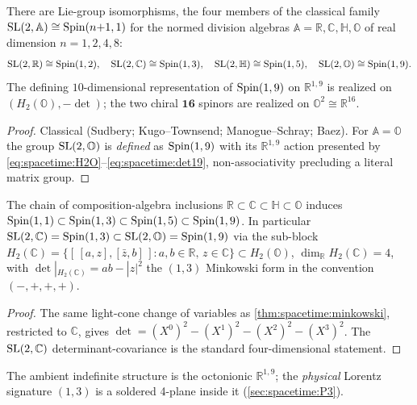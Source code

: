 \begin{theorem}
\label{thm:spacetime:exc}
There are Lie-group isomorphisms, the four members of the classical family
$\mathrm{SL}(2,\mathbb A)\cong\operatorname{Spin}(n{+}1,1)$ for the normed division algebras
$\mathbb A=\mathbb R,\mathbb C,\mathbb H,\mathbb O$ of real dimension $n=1,2,4,8$:
\begin{equation}\label{eq:spacetime:sl2}
  \mathrm{SL}(2,\mathbb R)\cong\operatorname{Spin}(1,2),\quad
  \mathrm{SL}(2,\mathbb C)\cong\operatorname{Spin}(1,3),\quad
  \mathrm{SL}(2,\mathbb H)\cong\operatorname{Spin}(1,5),\quad
  \mathrm{SL}(2,\mathbb O)\cong\operatorname{Spin}(1,9).
\end{equation}
The defining $10$-dimensional representation of $\operatorname{Spin}(1,9)$ on $\mathbb R^{1,9}$ is
realized on $(H_2(\mathbb O),-\det)$; the two chiral $\mathbf{16}$ spinors are
realized on $\mathbb O^2\cong\mathbb R^{16}$.
\end{theorem}
\begin{proof}
Classical (Sudbery; Kugo--Townsend; Manogue--Schray; Baez). For $\mathbb A=\mathbb O$
the group $\mathrm{SL}(2,\mathbb O)$ is \emph{defined} as $\operatorname{Spin}(1,9)$ with its
$\mathbb R^{1,9}$ action presented by \eqref{eq:spacetime:H2O}--\eqref{eq:spacetime:det19},
non-associativity precluding a literal matrix group.
\end{proof}

\begin{theorem}
\label{thm:spacetime:lorentz4}
\label{thm:Lorentz}
The chain of composition-algebra inclusions $\mathbb R\subset\mathbb C\subset\mathbb H\subset\mathbb O$
induces $\operatorname{Spin}(1,1)\subset\operatorname{Spin}(1,3)\subset\operatorname{Spin}(1,5)\subset\operatorname{Spin}(1,9)$. In particular
$\mathrm{SL}(2,\mathbb C)=\operatorname{Spin}(1,3)\subset\mathrm{SL}(2,\mathbb O)=\operatorname{Spin}(1,9)$ via the sub-block
$H_2(\mathbb C)=\{[\,[a,z],[\bar z,b]\,]:a,b\in\mathbb R,\,z\in\mathbb C\}\subset H_2(\mathbb O)$,
$\dim_{\mathbb R}H_2(\mathbb C)=4$, with $\det|_{H_2(\mathbb C)}=ab-|z|^2$ the $(1,3)$
Minkowski form in the convention $(-,+,+,+)$.
\end{theorem}
\begin{proof}
The same light-cone change of variables as \autoref{thm:spacetime:minkowski},
restricted to $\mathbb C$, gives $\det=(X^0)^2-(X^1)^2-(X^2)^2-(X^3)^2$. The
$\mathrm{SL}(2,\mathbb C)$ determinant-covariance is the standard four-dimensional statement.
\end{proof}

The ambient indefinite structure is the octonionic $\mathbb R^{1,9}$; the
\emph{physical} Lorentz signature $(1,3)$ is a soldered 4-plane inside it
(\autoref{sec:spacetime:P3}).

